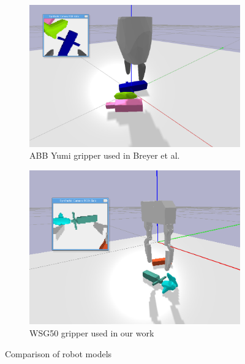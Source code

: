 \begin{figure}

    \begin{subfigure}{0.49\textwidth}
      \includegraphics[width=\linewidth]{figures/breyerModel.png}
      \caption{ABB Yumi gripper used in Breyer et al.} \label{fig:breyer}
    \end{subfigure}%
    \hspace*{\fill}   %
    \begin{subfigure}{0.49\textwidth}
      \includegraphics[width=\linewidth]{figures/ourModel.png}
      \caption{WSG50 gripper used in our work} \label{fig:ourmodel}
    \end{subfigure}%
    \hspace*{\fill}   %


\caption{ Comparison of robot models \label{fig:robots}}
\end{figure}
